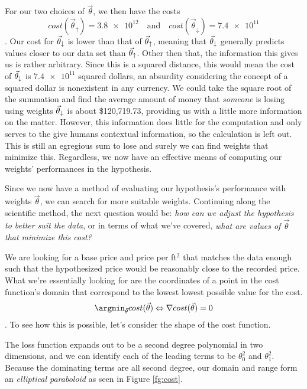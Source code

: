 For our two choices of $\vec\theta$, we then have the costs
\begin{equation}\label{eq:tud cost results}
    cost(\vec\theta_{\uparrow})= \num{3.8e12} \quad \text{and} \quad
    cost(\vec\theta_{\downarrow}) = \num{7.4e11}
\end{equation}
. Our cost for $\vec\theta_{\downarrow}$ is lower than that of $\vec\theta_{\uparrow}$, meaning that $\vec\theta_{\downarrow}$ generally
predicts values closer to our data set than $\vec\theta_{\uparrow}$. Other then that, the
information this gives us is rather arbitrary. Since this is a squared distance,
this would mean the cost of $\vec\theta_{\downarrow}$ is $\num{7.4e11}$ squared dollars, an
absurdity considering the concept of a squared dollar is nonexistent in any
currency.  We could take the square root of the summation and find the average
amount of money that \emph{someone} is losing using weights $\vec\theta_{\downarrow}$ is about
\$120,719.73, providing us with a little more information on the matter.
However, this information does little for the computation and only serves to the
give humans contextual information, so the calculation is left out. This is
still an egregious sum to lose and surely we can find weights that minimize
this. Regardless, we now have an effective means of computing our weights'
performances in the hypothesis.

Since we now have a method of evaluating our hypothesis's performance with
weights $\vec\theta$, we can search for more suitable weights. Continuing along
the scientific method, the next question would be: \emph{how can we adjust the
hypothesis to better suit the data}, or in terms of what we've covered,
\emph{what are values of $\vec\theta$ that minimize this cost?}

We are looking for a base price and price per ft$^2$ that matches the data
enough such that the hypothesized price would be reasonably close to the
recorded price. What we're essentially looking for are the coordinates of a
point in the cost function's domain that correspond to the lowest lowest
possible value for the cost.
\begin{equation}
    \argmin_{\vec\theta} cost(\vec\theta) \Leftrightarrow \nabla
    cost(\vec\theta) = 0
\end{equation}
. To see how this is possible, let's consider the shape of the cost function.

The loss function expands out to be a second degree polynomial in two
dimensions, and we can identify each of the leading terms to be $\theta_0^2$ and
$\theta_1^2$. Because the dominating terms are all second degree, our domain and
range form an \emph{elliptical paraboloid} as seen in Figure \ref{fg:cost}. 

